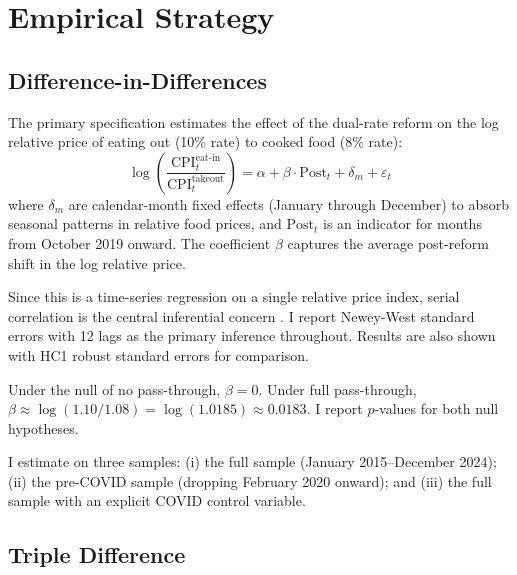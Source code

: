 \documentclass[12pt]{article}
\begin{document}
\section{Empirical Strategy}
\label{sec:strategy}

\subsection{Difference-in-Differences}

The primary specification estimates the effect of the dual-rate reform on the log relative price of eating out (10\% rate) to cooked food (8\% rate):
\begin{equation}
\log\left(\frac{\text{CPI}_{t}^{\text{eat-in}}}{\text{CPI}_{t}^{\text{takeout}}}\right) = \alpha + \beta \cdot \text{Post}_t + \delta_m + \varepsilon_t
\label{eq:dd}
\end{equation}
where $\delta_m$ are calendar-month fixed effects (January through December) to absorb seasonal patterns in relative food prices, and $\text{Post}_t$ is an indicator for months from October 2019 onward. The coefficient $\beta$ captures the average post-reform shift in the log relative price.

Since this is a time-series regression on a single relative price index, serial correlation is the central inferential concern \citep{bertrand2004much}. I report Newey-West standard errors with 12 lags as the primary inference throughout. Results are also shown with HC1 robust standard errors for comparison.

Under the null of no pass-through, $\beta = 0$. Under full pass-through, $\beta \approx \log(1.10/1.08) = \log(1.0185) \approx 0.0183$. I report $p$-values for both null hypotheses.

I estimate  on three samples: (i) the full sample (January 2015--December 2024); (ii) the pre-COVID sample (dropping February 2020 onward); and (iii) the full sample with an explicit COVID control variable.

\subsection{Triple Difference}
\end{document}
